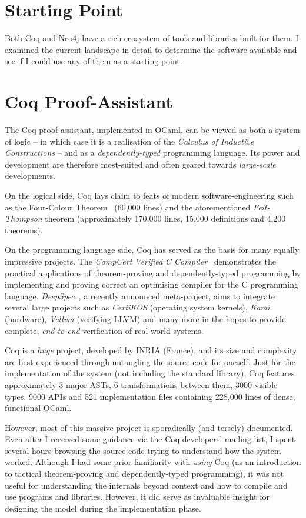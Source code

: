 \section{Starting Point}

Both Coq and Neo4j have a rich ecosystem of tools and libraries built for them.
I examined the current landscape in detail to determine the software available
and see if I could use any of them as a starting point.

\section{Coq Proof-Assistant}

The Coq proof-assistant, implemented in OCaml, can be viewed as both a system of
logic -- in which case it is a realisation of the \emph{Calculus of Inductive
Constructions} -- and as a \emph{dependently-typed} programming language. Its
power and development are therefore most-suited and often geared towards
\emph{large-scale} developments.

On the logical side, Coq lays claim to feats of modern software-engineering such
as the Four-Colour Theorem~\cite{gonthier2008formal} (60,000 lines) and the
aforementioned \emph{Feit-Thompson} theorem (approximately 170,000 lines, 15,000
definitions and 4,200 theorems).

On the programming language side, Coq has served as the basis for many equally
impressive projects. The \emph{CompCert Verified C
Compiler}~\cite{leroy2012compcert} demonstrates the practical applications of
theorem-proving and dependently-typed programming by implementing and proving
correct an optimising compiler for the C programming language.
\emph{DeepSpec}~\cite{pierce2016science}, a recently announced meta-project,
aims to integrate several large projects such as \emph{CertiKOS} (operating
system kernels), \emph{Kami} (hardware), \emph{Vellvm} (verifying LLVM) and many
more in the hopes to provide complete, \emph{end-to-end} verification of
real-world systems.

Coq is a \emph{huge} project, developed by INRIA (France), and its size and
complexity are best experienced through untangling the source code for oneself.
Just for the implementation of the system (not including the standard library),
Coq features approximately 3 major ASTs, 6 transformations between them, 3000
visible types, 9000 APIs and 521 implementation files containing 228,000 lines
of dense, functional OCaml.

However, most of this massive project is sporadically (and tersely) documented.
Even after I received some guidance via the Coq developers' mailing-list, I
spent several hours browsing the source code trying to understand how the system
worked. Although I had some prior familiarity with \emph{using} Coq (as an
introduction to tactical theorem-proving and dependently-typed programming), it
was not useful for understanding the internals beyond context and how to compile
and use programs and libraries. However, it did serve as invaluable insight for
designing the model during the implementation phase.

